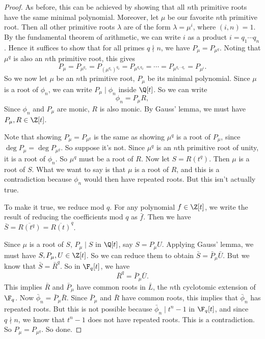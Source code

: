 \documentclass[a4paper]{article}
\begin{document}
\begin{proof}
  As before, this can be achieved by showing that all $n$th primitive roots have the same minimal polynomial. Moreover, let $\mu$ be our favorite $n$th primitive root. Then all other primitive roots $\lambda$ are of the form $\lambda = \mu^i$, where $(i, n) = 1$. By the fundamental theorem of arithmetic, we can write $i$ as a product $i = q_1 \cdots q_n$. Hence it suffices to show that for all primes $q \nmid n$, we have $P_{\mu} = P_{\mu^q}$. Noting that $\mu^q$ is also an $n$th primitive root, this gives
  \[
    P_{\mu} = P_{\mu^{q_1}} = P_{(\mu^{q_1})^{q_2}} = P_{\mu^{q_1q_2}} = \cdots = P_{\mu^{q_1\cdots q_r}} = P_{\mu^i}.
  \]
  So we now let $\mu$ be an $n$th primitive root, $P_\mu$ be its minimal polynomial. Since $\mu$ is a root of $\phi_n$, we can write $P_\mu \mid \phi_n$ inside $\Q[t]$. So we can write
  \[
    \phi_n = P_\mu R,
  \]
  Since $\phi_n$ and $P_\mu$ are monic, $R$ is also monic. By Gauss' lemma, we must have $P_\mu, R \in \Z[t]$.

  Note that showing $P_\mu = P_{\mu^q}$ is the same as showing $\mu^q$ is a root of $P_\mu$, since $\deg P_\mu = \deg P_{\mu^q}$. So suppose it's not. Since $\mu^q$ is an $n$th primitive root of unity, it is a root of $\phi_n$. So $\mu^q$ must be a root of $R$. Now let $S = R(t^q)$. Then $\mu$ is a root of $S$. What we want to say is that $\mu$ is a root of $R$, and this is a contradiction because $\phi_n$ would then have repeated roots. But this isn't actually true.

  To make it true, we reduce mod $q$. For any polynomial $f \in \Z[t]$, we write the result of reducing the coefficients mod $q$ as $\bar{f}$. Then we have $\bar{S} = \overline{R(t^q)} = \overline{R(t)}^q$.

  Since $\mu$ is a root of $S$, $P_\mu \mid S$ in $\Q[t]$, say $S = P_\mu U$. Applying Gauss' lemma, we must have $S, P_\mu, U \in \Z[t]$. So we can reduce them to obtain $\bar{S} = \bar{P}_\mu \bar{U}$. But we know that $\bar{S} = \bar{R}^q$. So in $\F_q[t]$, we have
  \[
    \bar{R}^q = \bar{P}_\mu \bar{U}.
  \]
  This implies $\bar{R}$ and $\bar{P}_\mu$ have common roots in $\bar{L}$, the $n$th cyclotomic extension of $\F_q$. Now $\bar{\phi}_n = \bar{P}_\mu \bar{R}$. Since $\bar{P}_\mu$ and $\bar{R}$ have common roots, this implies that $\bar{\phi}_n$ has repeated roots. But this is not possible because $\bar{\phi}_n \mid t^{n} - 1$ in $\F_q[t]$, and since $q\nmid n$, we know that $t^{n} - 1$ does not have repeated roots. This is a contradiction. So $P_\mu = P_{\mu^q}$. So done.
\end{proof}
\end{document}

